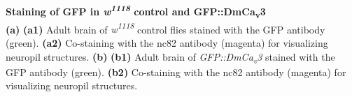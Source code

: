 \label{fig:S1} 
\textbf{Staining of GFP in \emph{w\textsuperscript{1118}} control and GFP::DmCa\textsubscript{v}3}
\\ 
\textbf{(a)} \textbf{(a1)} Adult brain of \emph{w\textsuperscript{1118}} control flies stained with the GFP antibody (green).
\textbf{(a2)} Co-staining with the nc82 antibody (magenta) for visualizing neuropil structures.
\textbf{(b)} \textbf{(b1)} Adult brain of \emph{GFP::DmCa\textsubscript{v}3} stained with the GFP antibody (green).
\textbf{(b2)} Co-staining with the nc82 antibody (magenta) for visualizing neuropil structures.